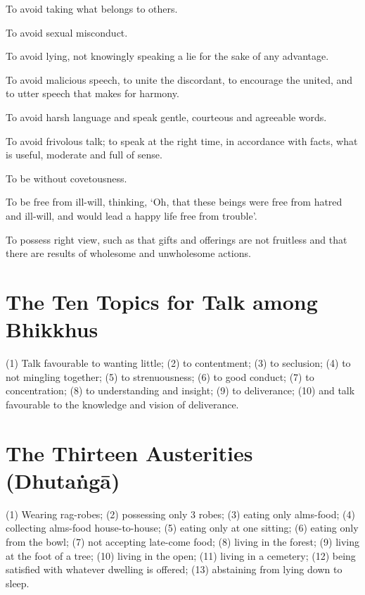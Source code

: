 To avoid taking what belongs to others.

To avoid sexual misconduct.

To avoid lying, not knowingly speaking a lie for the sake of any advantage.

To avoid malicious speech, to unite the discordant, to encourage the united, and
to utter speech that makes for harmony.

To avoid harsh language and speak gentle, courteous and agreeable words.

To avoid frivolous talk; to speak at the right time, in accordance with facts,
what is useful, moderate and full of sense.

To be without covetousness.

To be free from ill-will, thinking, ‘Oh, that these beings were free from hatred
and ill-will, and would lead a happy life free from trouble’.

To possess right view, such as that gifts and offerings are not fruitless and
that there are results of wholesome and unwholesome actions.


\ifhandbookedition
\vspace*{-\baselineskip}
\fi

\section*{The Ten Topics for Talk among Bhikkhus}

(1) Talk favourable to wanting little;
(2) to contentment;
(3) to seclusion;
(4) to not mingling together;
(5) to strenuousness;
(6) to good conduct;
(7) to concentration;
(8) to understanding and insight;
(9) to deliverance;
(10) and talk favourable to the knowledge and vision of deliverance.


\ifhandbookedition
\vspace*{-\baselineskip}
\fi

\section*{The Thirteen Austerities (Dhutaṅgā)}

(1) Wearing rag-robes;
(2) possessing only 3 robes;
(3) eating only alms-food;
(4) collecting alms-food house-to-house;
(5) eating only at one sitting;
(6) eating only from the bowl;
(7) not accepting late-come food;
(8) living in the forest;
(9) living at the foot of a tree;
(10) living in the open;
(11) living in a cemetery;
(12) being satisfied with whatever dwelling is offered;
(13) abstaining from lying down to sleep.

